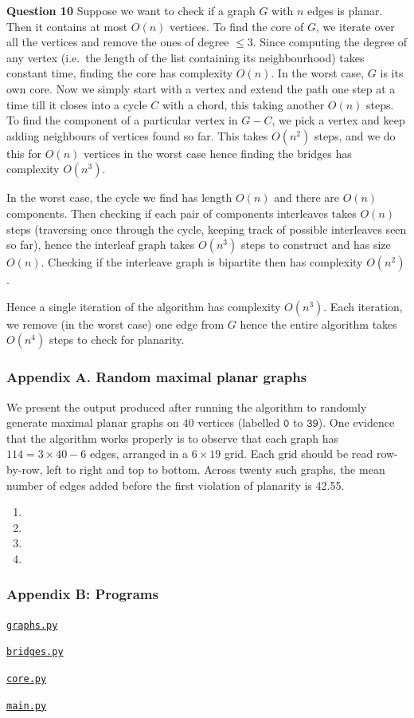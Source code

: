 \documentclass[12pt]{article}
\makeatletter
\newcommand{\verbatimfont}[1]{\def\verbatim@font{#1}}%
\makeatother
\begin{document}
\textbf{Question 10}\quad 
Suppose we want to check if a graph \(G\) with \(n\) edges is planar. Then it
contains at most \(O(n)\) vertices. To find the core of \(G\), we iterate over
all the vertices and remove the ones of degree \(\leq 3\). Since computing the
degree of any vertex (i.e.\ the length of the list containing its neighbourhood)
takes constant time, finding the core has complexity \(O(n)\). In the worst
case, \(G\) is its own core. Now we simply start with a vertex and extend the
path one step at a time till it closes into a cycle \(C\) with a chord, this
taking another \(O(n)\) steps. To find the component of a particular vertex in
\(G-C\), we pick a vertex and keep adding neighbours of vertices found so far.
This takes \(O(n^2)\) steps, and we do this for \(O(n)\) vertices in the worst
case hence finding the bridges has complexity \(O(n^3)\). 

In the worst case, the cycle we find has length \(O(n)\) and there are \(O(n)\)
components. Then checking if each pair of components interleaves takes
\(O(n)\) steps (traversing once through the cycle, keeping track of possible
interleaves seen so far), hence the interleaf graph takes \(O(n^3)\) steps to construct and has size \(O(n)\). Checking if the interleave graph is bipartite then has complexity \(O(n^2)\).

Hence a single iteration of the algorithm has complexity \(O(n^3)\). Each
iteration, we remove (in the worst case) one edge from \(G\) hence the entire
algorithm takes \(O(n^4)\) steps to check for planarity.

\subsubsection*{Appendix A. \quad Random maximal planar graphs}
We present the output produced after running the algorithm to
randomly generate maximal planar graphs on \(40\) vertices (labelled
\(\texttt{0}\) to \(\texttt{39}\)). One evidence that the algorithm works
properly is to observe that each graph has \(114 = 3\times 40 - 6\) edges,
arranged in a \(6\times 19\) grid. Each grid should be read row-by-row, left to
right and top to bottom. Across twenty such graphs, the mean number of edges
added before the first violation of planarity is 42.55.
\verbatimfont{\footnotesize\ttfamily}
\begin{enumerate}[1.]
    \item  
    \item  
    \item  
    \item  
\end{enumerate}

\subsubsection*{Appendix B: Programs}

\underline{\texttt{graphs.py}}


\underline{\texttt{bridges.py}}


\underline{\texttt{core.py}}


\underline{\texttt{main.py}}

\end{document}
